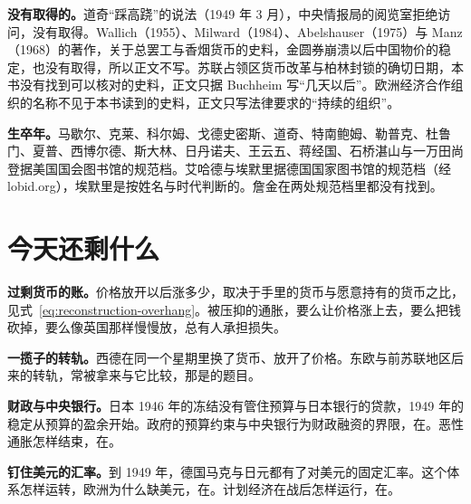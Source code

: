\begin{deeper}[史料说明]
\textbf{没有取得的。}道奇“踩高跷”的说法（1949 年 3 月），中央情报局的阅览室拒绝访问，没有取得。Wallich（1955）、Milward（1984）、Abelshauser（1975）与 Manz（1968）的著作，关于总罢工与香烟货币的史料，金圆券崩溃以后中国物价的稳定，也没有取得，所以正文不写。苏联占领区货币改革与柏林封锁的确切日期，本书没有找到可以核对的史料，正文只据 Buchheim 写“几天以后”。欧洲经济合作组织的名称不见于本书读到的史料，正文只写法律要求的“持续的组织”。

\textbf{生卒年。}马歇尔、克莱、科尔姆、戈德史密斯、道奇、特南鲍姆、勒普克、杜鲁门、夏普、西博尔德、斯大林、日丹诺夫、王云五、蒋经国、石桥湛山与一万田尚登据美国国会图书馆的规范档。艾哈德与埃默里据德国国家图书馆的规范档（经 lobid.org），埃默里是按姓名与时代判断的。詹金在两处规范档里都没有找到。
\end{deeper}

\section{今天还剩什么}\label{sec:reconstruction-legacy}

\textbf{过剩货币的账。}价格放开以后涨多少，取决于手里的货币与愿意持有的货币之比，见式~\eqref{eq:reconstruction-overhang}。被压抑的通胀，要么让价格涨上去，要么把钱砍掉，要么像英国那样慢慢放，总有人承担损失。

\textbf{一揽子的转轨。}西德在同一个星期里换了货币、放开了价格。东欧与前苏联地区后来的转轨，常被拿来与它比较，那是的题目。

\textbf{财政与中央银行。}日本 1946 年的冻结没有管住预算与日本银行的贷款，1949 年的稳定从预算的盈余开始。政府的预算约束与中央银行为财政融资的界限，在。恶性通胀怎样结束，在。

\textbf{钉住美元的汇率。}到 1949 年，德国马克与日元都有了对美元的固定汇率。这个体系怎样运转，欧洲为什么缺美元，在。计划经济在战后怎样运行，在。

